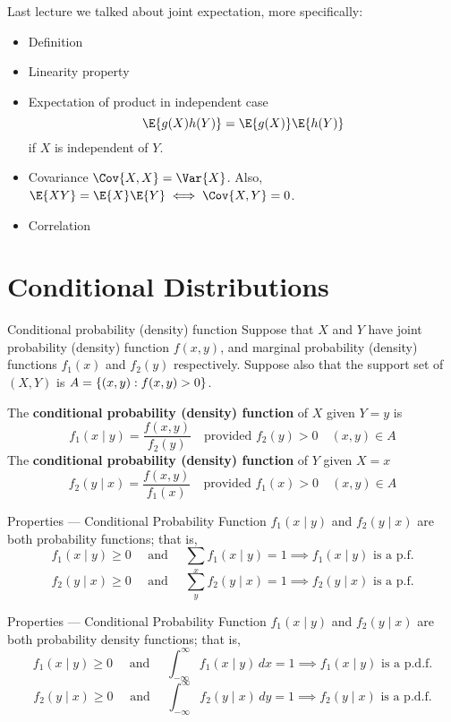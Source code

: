 Last lecture we talked about joint expectation, more specifically:
\begin{itemize}
    \item Definition
    \item Linearity property
    \item Expectation of product in independent case
          \[ \E{g(X)h(Y)}=\E{g(X)}\E{h(Y)} \]
          if $ X $ is independent of $ Y $.
    \item Covariance $ \Cov{X,X}=\Var{X} $. Also,
          $ \E{XY}=\E{X}\E{Y}\iff \Cov{X,Y}=0 $.
    \item Correlation
\end{itemize}
\section{Conditional Distributions}
\begin{Definition}{Conditional probability (density) function}{}
    Suppose that $ X $ and $ Y $ have joint probability
    (density) function $ f(x,y) $,
    and marginal probability (density) functions
    $ f_1(x) $ and $ f_2(y) $ respectively.
    Suppose also that the support set
    of $ (X,Y) $ is $ A=\{(x,y):f(x,y)>0\} $.

    The \textbf{conditional probability (density) function}
    of $ X $ given $ Y=y $ is
    \[ f_1(x\mid y)=\frac{f(x,y)}{f_2(y)}\quad\text{provided } f_2(y)>0\quad (x,y)\in A \]
    The \textbf{conditional probability (density) function} of $ Y $ given $ X=x $
    \[ f_2(y\mid x)=\frac{f(x,y)}{f_1(x)}\quad\text{provided } f_1(x)>0\quad (x,y)\in A \]
\end{Definition}
\begin{Proposition}{Properties --- Conditional Probability Function}{}
    $ f_1(x\mid y) $ and $ f_2(y\mid x) $ are both probability functions;
    that is,
    \[ f_1(x\mid y)\ge 0 \quad\text{ and }\quad
        \sum_{x}f_1(x\mid y)=1\implies f_1(x\mid y)\text{ is a p.f.}\]
    \[ f_2(y\mid x)\ge 0 \quad\text{ and }\quad
        \sum_{y}f_2(y\mid x)=1\implies f_2(y\mid x)\text{ is a p.f.}\]
\end{Proposition}
\begin{Proposition}{Properties --- Conditional Probability Function}{}
    $ f_1(x\mid y) $ and $ f_2(y\mid x) $ are both probability density functions;
    that is,
    \[ f_1(x\mid y)\ge 0 \quad\text{ and }\quad
        \int_{-\infty}^{\infty} f_1(x\mid y)\, d{x} =1\implies f_1(x\mid y)\text{ is a p.d.f.}\]
    \[ f_2(y\mid x)\ge 0 \quad\text{ and }\quad
        \int_{-\infty}^{\infty} f_2(y\mid x)\, d{y}=1\implies f_2(y\mid x)\text{ is a p.d.f.}\]
\end{Proposition}
